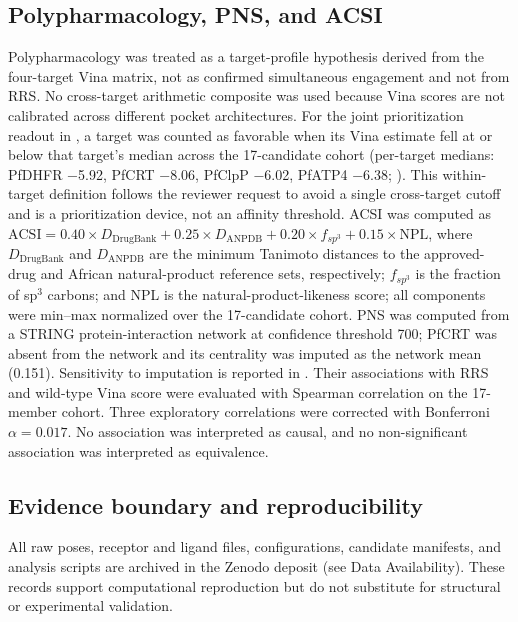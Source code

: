 \documentclass[journal=jcisd8,manuscript=article]{achemso}
\begin{document}
\subsection{Polypharmacology, PNS, and ACSI}\label{sec:methods_pns}
Polypharmacology was treated as a target-profile hypothesis derived from the four-target Vina matrix, not as confirmed simultaneous engagement and not from RRS. No cross-target arithmetic composite was used because Vina scores are not calibrated across different pocket architectures. For the joint prioritization readout in , a target was counted as favorable when its Vina estimate fell at or below that target's median across the \num{17}-candidate cohort (per-target medians: PfDHFR \num{-5.92}, PfCRT \num{-8.06}, PfClpP \num{-6.02}, PfATP4 \num{-6.38}; ). This within-target definition follows the reviewer request to avoid a single cross-target cutoff and is a prioritization device, not an affinity threshold. ACSI was computed as $\mathrm{ACSI}=\num{0.40}\times D_{\mathrm{DrugBank}}+\num{0.25}\times D_{\mathrm{ANPDB}}+\num{0.20}\times f_{sp^3}+\num{0.15}\times\mathrm{NPL}$, where $D_{\mathrm{DrugBank}}$ and $D_{\mathrm{ANPDB}}$ are the minimum Tanimoto distances to the approved-drug and African natural-product reference sets, respectively; $f_{sp^3}$ is the fraction of sp$^3$ carbons; and NPL is the natural-product-likeness score; all components were min--max normalized over the 17-candidate cohort. PNS was computed from a STRING protein-interaction network at confidence threshold \num{700}; PfCRT was absent from the network and its centrality was imputed as the network mean (\num{0.151}). Sensitivity to imputation is reported in . Their associations with RRS and wild-type Vina score were evaluated with Spearman correlation on the 17-member cohort. Three exploratory correlations were corrected with Bonferroni $\alpha=\num{0.017}$. No association was interpreted as causal, and no non-significant association was interpreted as equivalence.

\subsection{Evidence boundary and reproducibility}\label{sec:methods_boundary}
All raw poses, receptor and ligand files, configurations, candidate manifests, and analysis scripts are archived in the Zenodo deposit (see Data Availability). These records support computational reproduction but do not substitute for structural or experimental validation.
\end{document}
